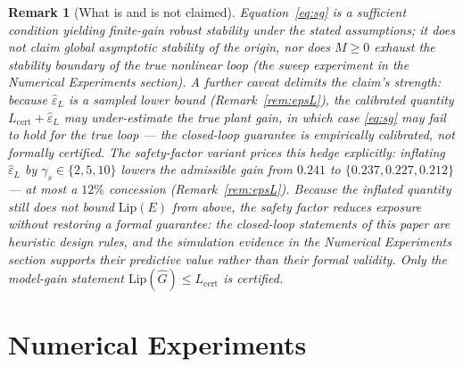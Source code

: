 \documentclass[11pt,sagev,times]{sagej}
\newtheorem{remark}{Remark}
\newcommand{\Ghat}{\hat{G}}
\newcommand{\Lhat}{L_{\mathrm{cert}}}
\newcommand{\epsL}{\varepsilon_L}
\begin{document}
\begin{remark}[What is and is not claimed]\label{rem:claim}
Equation~\eqref{eq:sg} is a \emph{sufficient} condition yielding
finite-gain robust stability under the stated assumptions; it does not claim
global asymptotic stability of the origin, nor does $M\ge0$ exhaust the
stability boundary of the true nonlinear loop (the sweep experiment in the Numerical Experiments section).
A further caveat delimits the claim's strength: because $\hat\epsL$ is a
sampled \emph{lower} bound (Remark~\ref{rem:epsL}), the calibrated
quantity $\Lhat+\hat\epsL$ may under-estimate the true plant gain, in
which case \eqref{eq:sg} may fail to hold for the true loop --- the
closed-loop guarantee is \emph{empirically calibrated}, not formally
certified. The safety-factor variant prices this hedge explicitly:
inflating $\hat\epsL$ by $\gamma_s\in\{2,5,10\}$ lowers the admissible
gain from $0.241$ to $\{0.237,0.227,0.212\}$ --- at most a $12\%$
concession (Remark~\ref{rem:epsL}). Because the inflated quantity still
does not bound $\mathrm{Lip}(E)$ from above, the safety factor reduces
exposure without restoring a formal guarantee: the closed-loop statements
of this paper are heuristic design rules, and the simulation evidence in the Numerical Experiments section supports their \emph{predictive} value rather
than their formal validity. Only the model-gain statement
$\mathrm{Lip}(\Ghat)\le\Lhat$ is certified.
\end{remark}

\section{Numerical Experiments}\label{sec:experiments}
\end{document}
